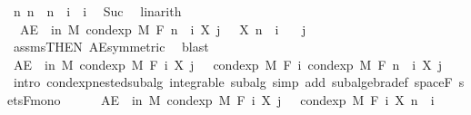 \begin{isabellebody}
\ n{\isacharcolon}{\kern0pt}\ {\isachardoublequoteopen}n\ {\isacharequal}{\kern0pt}\ n\ {\isacharplus}{\kern0pt}\ i\ {\isacharminus}{\kern0pt}\ i{\isachardoublequoteclose}\ \isamarkupfalse%
\ Suc\ \isamarkupfalse%
\ linarith\isanewline
\ \ \ \ \isamarkupfalse%
\ {\isacharasterisk}{\kern0pt}{\isacharcolon}{\kern0pt}\ {\isachardoublequoteopen}AE\ {\isasymxi}\ in\ M{\isachardot}{\kern0pt}\ cond{\isacharunderscore}{\kern0pt}exp\ M\ {\isacharparenleft}{\kern0pt}F\ {\isacharparenleft}{\kern0pt}n\ {\isacharplus}{\kern0pt}\ i{\isacharparenright}{\kern0pt}{\isacharparenright}{\kern0pt}\ {\isacharparenleft}{\kern0pt}X\ j{\isacharparenright}{\kern0pt}\ {\isasymxi}\ {\isacharequal}{\kern0pt}\ X\ {\isacharparenleft}{\kern0pt}n\ {\isacharplus}{\kern0pt}\ i{\isacharparenright}{\kern0pt}\ {\isasymxi}{\isachardoublequoteclose}\ \isamarkupfalse%
\ j\ \isamarkupfalse%
\ assms{\isacharparenleft}{\kern0pt}{}{\isacharparenright}{\kern0pt}{\isacharbrackleft}{\kern0pt}THEN\ AE{\isacharunderscore}{\kern0pt}symmetric{\isacharbrackright}{\kern0pt}\ \isamarkupfalse%
\ blast\isanewline
\ \ \ \ \isamarkupfalse%
\ {\isachardoublequoteopen}AE\ {\isasymxi}\ in\ M{\isachardot}{\kern0pt}\ cond{\isacharunderscore}{\kern0pt}exp\ M\ {\isacharparenleft}{\kern0pt}F\ i{\isacharparenright}{\kern0pt}\ {\isacharparenleft}{\kern0pt}X\ j{\isacharparenright}{\kern0pt}\ {\isasymxi}\ {\isacharequal}{\kern0pt}\ cond{\isacharunderscore}{\kern0pt}exp\ M\ {\isacharparenleft}{\kern0pt}F\ i{\isacharparenright}{\kern0pt}\ {\isacharparenleft}{\kern0pt}cond{\isacharunderscore}{\kern0pt}exp\ M\ {\isacharparenleft}{\kern0pt}F\ {\isacharparenleft}{\kern0pt}n\ {\isacharplus}{\kern0pt}\ i{\isacharparenright}{\kern0pt}{\isacharparenright}{\kern0pt}\ {\isacharparenleft}{\kern0pt}X\ j{\isacharparenright}{\kern0pt}{\isacharparenright}{\kern0pt}\ {\isasymxi}{\isachardoublequoteclose}\ \isamarkupfalse%
\ {\isacharparenleft}{\kern0pt}intro\ cond{\isacharunderscore}{\kern0pt}exp{\isacharunderscore}{\kern0pt}nested{\isacharunderscore}{\kern0pt}subalg\ integrable\ subalg{\isacharcomma}{\kern0pt}\ simp\ add{\isacharcolon}{\kern0pt}\ subalgebra{\isacharunderscore}{\kern0pt}def\ space{\isacharunderscore}{\kern0pt}F\ sets{\isacharunderscore}{\kern0pt}F{\isacharunderscore}{\kern0pt}mono{\isacharparenright}{\kern0pt}\isanewline
\ \ \ \ \isamarkupfalse%
\ {\isachardoublequoteopen}AE\ {\isasymxi}\ in\ M{\isachardot}{\kern0pt}\ cond{\isacharunderscore}{\kern0pt}exp\ M\ {\isacharparenleft}{\kern0pt}F\ i{\isacharparenright}{\kern0pt}\ {\isacharparenleft}{\kern0pt}X\ j{\isacharparenright}{\kern0pt}\ {\isasymxi}\ {\isacharequal}{\kern0pt}\ cond{\isacharunderscore}{\kern0pt}exp\ M\ {\isacharparenleft}{\kern0pt}F\ i{\isacharparenright}{\kern0pt}\ {\isacharparenleft}{\kern0pt}X\ {\isacharparenleft}{\kern0pt}n\ {\isacharplus}{\kern0pt}\ i{\isacharparenright}{\kern0pt}{\isacharparenright}{\kern0pt}\ {\isasymxi}{\isachardoublequoteclose}\ \isamarkupfalse%

\end{isabellebody}
